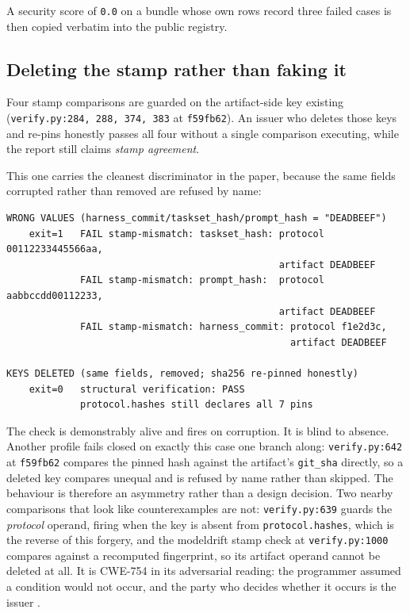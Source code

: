 \documentclass[11pt]{article}
\begin{document}
A security score of \texttt{0.0} on a bundle whose own rows record three failed cases is then
copied verbatim into the public registry.

\subsection{Deleting the stamp rather than faking it}
\label{sec:sec-forge-stamp}

Four stamp comparisons are guarded on the artifact-side key existing
(\texttt{verify.py:284, 288, 374, 383} at \texttt{f59fb62}). An issuer who deletes those keys
and re-pins honestly passes all four without a single comparison executing, while the report
still claims \emph{stamp agreement}.

This one carries the cleanest discriminator in the paper, because the same fields corrupted
rather than removed are refused by name:

\begin{Verbatim}[frame=single,fontsize=\small]
WRONG VALUES (harness_commit/taskset_hash/prompt_hash = "DEADBEEF")
    exit=1   FAIL stamp-mismatch: taskset_hash: protocol 00112233445566aa,
                                                artifact DEADBEEF
             FAIL stamp-mismatch: prompt_hash:  protocol aabbccdd00112233,
                                                artifact DEADBEEF
             FAIL stamp-mismatch: harness_commit: protocol f1e2d3c,
                                                  artifact DEADBEEF

KEYS DELETED (same fields, removed; sha256 re-pinned honestly)
    exit=0   structural verification: PASS
             protocol.hashes still declares all 7 pins
\end{Verbatim}

The check is demonstrably alive and fires on corruption. It is blind to absence. Another
profile fails closed on exactly this case one branch along: \texttt{verify.py:642} at
\texttt{f59fb62} compares the pinned hash against the artifact's \texttt{git\_sha} directly, so
a deleted key compares unequal and is refused by name rather than skipped. The behaviour is
therefore an asymmetry rather than a design decision. Two nearby comparisons that look like
counterexamples are not: \texttt{verify.py:639} guards the \emph{protocol} operand, firing when
the key is absent from \texttt{protocol.hashes}, which is the reverse of this forgery, and the
modeldrift stamp check at \texttt{verify.py:1000} compares against a recomputed fingerprint, so
its artifact operand cannot be deleted at all. It is
CWE-754 in its adversarial reading: the programmer assumed a condition would not occur, and
the party who decides whether it occurs is the issuer \citep{cwe754}.
\end{document}
